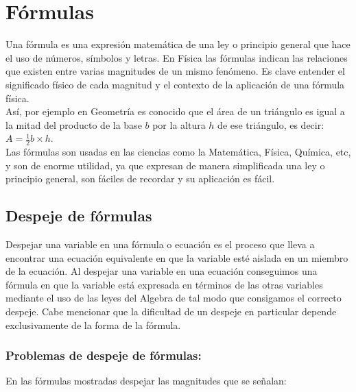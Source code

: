 \section{Fórmulas}

Una fórmula es una expresión matemática de una ley o principio general que hace el uso de números, símbolos y letras. En Física 
las fórmulas indican las relaciones que existen entre varias magnitudes de un mismo fenómeno. Es clave entender el significado 
físico de cada magnitud y el contexto de la aplicación de una fórmula física.\\

Así, por ejemplo en Geometría es conocido que el área de un triángulo es igual a la mitad del producto de la base $b$ por la 
altura $h$ de ese triángulo, es decir: $A = \frac{1}{2}b\times h$.\\

Las fórmulas son usadas en las ciencias como la Matemática, Física, Química, etc, y son de enorme utilidad, ya que expresan de 
manera simplificada una ley o principio general, son fáciles de recordar y su aplicación es fácil.

\subsection{Despeje de fórmulas}

Despejar una variable en una fórmula o ecuación es el proceso que lleva a encontrar una ecuación equivalente en que la variable 
esté aislada en un miembro de la ecuación. Al despejar una variable en una ecuación conseguimos una fórmula en que la variable 
está expresada en términos de las otras variables mediante el uso de las leyes del Algebra de tal modo que consigamos el correcto 
despeje. Cabe mencionar que la dificultad de un despeje en particular depende exclusivamente de la forma de la fórmula.  


\subsubsection{Problemas de despeje de fórmulas:}

En las fórmulas mostradas despejar las magnitudes que se señalan:

